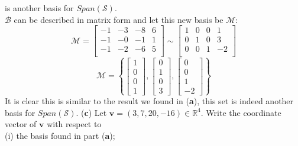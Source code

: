 \documentclass[12pt]{article}
\begin{document}
is another basis for $Span(\mathcal{S})$.\\
\medskip
$\mathcal{B}$ can be described in matrix form and let this new basis be $\mathcal{M}$:
$$
\mathcal{M}=
\begin{bmatrix}
   -1 & -3 & -8 & 6 \\	
   -1 & -0 & -1 & 1 \\
   -1 & -2 & -6 & 5 \\
\end{bmatrix}
\sim
\begin{bmatrix}
   1 & 0 & 0 & 1 \\	
   0 & 1 & 0 & 3 \\
   0 & 0 & 1 & -2 \\
\end{bmatrix}
$$
$$
\mathcal{M}=
\left\{
\begin{bmatrix}
   1 \\
   0 \\
   0 \\
   1
\end{bmatrix},
\begin{bmatrix}
   0 \\
   1 \\
   0 \\
   3
\end{bmatrix},
\begin{bmatrix}
   0 \\
   0 \\
   1 \\
   -2
\end{bmatrix}
\right\}
$$
It is clear this is similar to the result we found in (\textbf{a}), this set is indeed another basis for $Span(\mathcal{S})$.
(\textbf{c}) Let $\mathbf{v}=(3,7,20,-16)\in \mathbb{R}^4$. Write the coordinate vector of $\mathbf{v}$ with respect to\\
\hspace{40px}(i) the basis found in part (\textbf{a});
\end{document}
